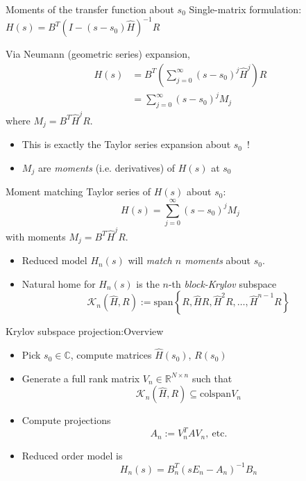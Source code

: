 \documentclass{beamer}
\newcommand{\R}{\mathbb{R}}
\newcommand{\C}{\mathbb{C}}
\newcommand{\A}{\widehat{H}}
\newcommand{\bigO}[1]{\mathcal{O}\left( #1 \right)}
\newcommand{\krylov}[3]{\mathcal{K}_{#1}\left({#2},{#3} \right)}
\theoremstyle{remark}
\begin{document}
\begin{frame}{Moments of the transfer function about $s_0$}%
  Single-matrix formulation: $H(s) = B^T\left(I-(s-s_0)\A\right)^{-1}R$
  \smallskip
  
  Via Neumann (geometric series) expansion, 
  		\begin{align*}
  			H(s) &= B^T\left(\sum_{j=0}^\infty (s-s_0)^j\A^j\right)R\\
  				 &= \sum_{j=0}^\infty (s-s_0)^jM_j
  		\end{align*}   
  		where $M_j =  B^T\A^j R$.
  		
  \begin{itemize}
  		\item This is exactly the Taylor series expansion about $s_0$\ !
  		\item $M_j$ are \emph{moments} (i.e. derivatives) of $H(s)$ at $s_0$	
  \end{itemize}   
\end{frame}
 
 
 
 
\begin{frame}{Moment matching}{}
  Taylor series of $H(s)$ about  $s_0$:
  	\[ H(s) = \sum_{j=0}^\infty (s-s_0)^jM_j \]
 	with moments $M_j =  B^T\A^j R$.
 	\medskip
 	
 	\begin{itemize}
 	    \item Reduced model $H_n(s)$ will \emph{match $n$ moments} about $s_0$. 
 	    \uncover<1>{\[ H_n(s) =  H(s) + \bigO{(s-s_0)^n} \]}
	  	\item<2-> Natural home for $H_n(s)$ is the $n$-th \emph{block-Krylov} subspace
	  		\[ 
	  		\krylov{n}{\A}{R}:= \text{span}\left\{R,\A R,\A^2R,\ldots,\A^{n-1}R\right\}
	  		\]
  	\end{itemize}			
\end{frame}
 
 

 
 
 \begin{frame}{Krylov subspace projection:}{Overview}
 
	 \begin{itemize}
		\item Pick $s_0\in\C$, compute matrices $\A(s_0)$, $R(s_0)$
		\item Generate a full rank matrix $V_n\in\R^{N\times n}$ such that
		\[ \krylov{n}{\A}{R} \subseteq \text{colspan} V_n \]
		\item Compute projections \[ A_n := V_n^TAV_n,\ \text{etc}.\]
		\item Reduced order model is \[ H_n(s)=B_n^T(sE_n-A_n)^{-1}B_n \]
	 \end{itemize}
 
 \end{frame}
\end{document}
